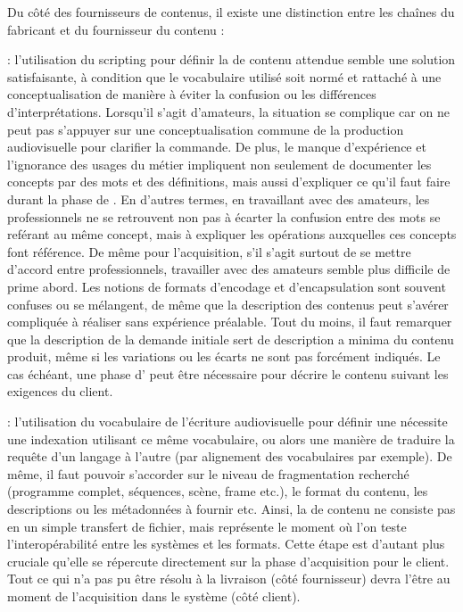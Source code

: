 Du côté des fournisseurs de contenus, il existe une distinction entre les chaînes du fabricant et du fournisseur du contenu :  

\begin{liste}
	\item {} : l'utilisation du scripting pour définir la  de contenu attendue semble une solution satisfaisante, à condition que le vocabulaire utilisé soit normé et rattaché à une conceptualisation de manière à éviter la confusion ou les différences d'interprétations. 
    Lorsqu'il s'agit d'amateurs, la situation se complique car on ne peut pas s'appuyer sur une conceptualisation commune de la production audiovisuelle pour clarifier la commande. 
    De plus, le manque d'expérience et l'ignorance des usages du métier impliquent non seulement de documenter les concepts par des mots et des définitions, mais aussi d'expliquer ce qu'il faut faire durant la phase de . 
    En d'autres termes, en travaillant avec des amateurs, les professionnels ne se retrouvent non pas à écarter la confusion entre des mots se reférant au même concept, mais à expliquer les opérations auxquelles ces concepts font référence. 
    De même pour l'acquisition, s'il s'agit surtout de se mettre d'accord entre professionnels, travailler avec des amateurs semble plus difficile de prime abord. 
    Les notions de formats d'encodage et d'encapsulation sont souvent confuses ou se mélangent, de même que la description des contenus peut s'avérer compliquée à réaliser sans expérience préalable. 
    Tout du moins, il faut remarquer que la description de la demande initiale sert de description a minima du contenu produit, même si les variations ou les écarts ne sont pas forcément indiqués.
    Le cas échéant, une phase d' peut être nécessaire pour décrire le contenu suivant les exigences du client.\\

	\item {} : l'utilisation du vocabulaire de l'écriture audiovisuelle pour définir une  nécessite une indexation utilisant ce même vocabulaire, ou alors une manière de traduire la requête d'un langage à l'autre (par alignement des vocabulaires par exemple). 
	De même, il faut pouvoir s'accorder sur le niveau de fragmentation recherché (programme complet, séquences, scène, frame etc.), le format du contenu, les descriptions ou les métadonnées à fournir etc.
	Ainsi, la  de contenu ne consiste pas en un simple transfert de fichier, mais représente le moment où l'on teste l'interopérabilité entre les systèmes et les formats. 
	Cette étape est d'autant plus cruciale qu'elle se répercute directement sur la phase d'acquisition pour le client. 
	Tout ce qui n'a pas pu être résolu à la livraison (côté fournisseur) devra l'être au moment de l'acquisition dans le système (côté client).\\
\end{liste}



